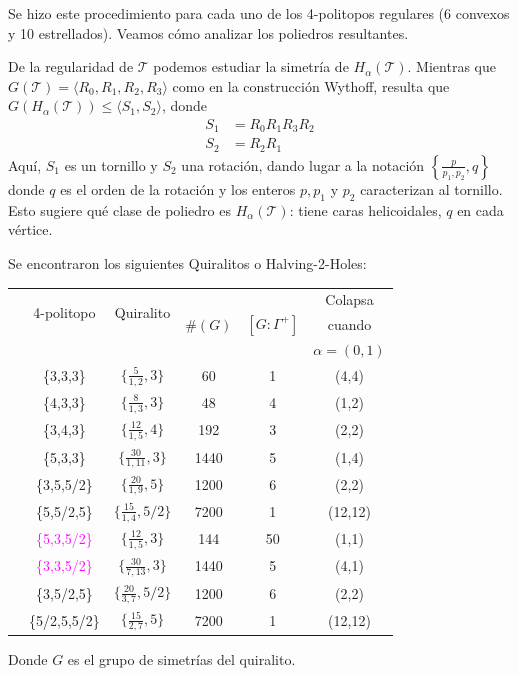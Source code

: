 \documentclass[spanish]{article}
\theoremstyle{definition}
\newcommand{\T}{\mathcal{T}}
\begin{document}
	Se hizo este procedimiento para cada uno de los 4-politopos regulares (6 convexos y 10 estrellados). Veamos cómo analizar los poliedros resultantes.
	
	De la regularidad de $\mathcal{T}$ podemos estudiar la simetría de $H_\alpha(\mathcal{T})$. Mientras que $G(\mathcal{T})=\langle R_0,R_1,R_2,R_3\rangle$ como en la construcción Wythoff, resulta que $G(H_\alpha(\mathcal{T}))\leq \langle S_1,S_2\rangle$, donde
	\begin{align*}
		S_1&=R_0R_1R_3R_2\\
		S_2&=R_2R_1
	\end{align*}
	Aquí, $S_1$ es un tornillo y $S_2$ una rotación, dando lugar a la notación $\left\{\frac{p}{p_1,p_2},q\right\}$ donde $q$ es el orden de la rotación y los enteros $p,p_1$ y $p_2$ caracterizan al tornillo. Esto sugiere qué clase de poliedro es $H_\alpha(\mathcal{T})$: tiene caras helicoidales, $q$ en cada vértice.
	
	Se encontraron los siguientes Quiralitos o Halving-2-Holes:
	
	\begin{center}
		\begin{tabular}{|c|c|c|c|c|c|}
			\hline
			&\multirow{2}{*}{4-politopo} &\multirow{2}{*}{Quiralito}&  \multirow{3}{*}{$\#(G)$} &\multirow{3}{*}{$[G:\Gamma^+]$}& Colapsa\\
			&\multirow{2}{*}{ $\T$}&\multirow{2}{*}{$H_\alpha(T)$}&&&cuando\\
			&&&&&$\alpha=(0,1)$ \\
			\hline\hline
			\multirow{5}{*}{\rotatebox{90}{Convexos}}&\{3,3,3\} & $\{\frac{5}{1,2},3\}$ &60& 1 & (4,4) \\
			&\{4,3,3\} & $\{\frac{8}{1,3},3\}$ &48& 4&(1,2) \\
			&\{3,4,3\} & $\{\frac{12}{1,5},4\}$ &192&3&(2,2) \\
			&\{5,3,3\} & $\{\frac{30}{1,11},3\}$ &1440&5&(1,4)\\
			\hline
			\multirow{6}{*}{\rotatebox{90}{Estrellados}}&\{3,5,5/2\} &$\{\frac{20}{1,9},5\}$&1200&6&(2,2)\\
			&\{5,5/2,5\} & $\{\frac{15}{1,4},5/2\}$ &7200&1&(12,12)\\\cline{2-6}
			&\textcolor{magenta}{\{5,3,5/2\}} & $\{\frac{12}{1,5},3\}$ &144&50&(1,1)\\\cline{2-6}
			&\textcolor{magenta}{\{3,3,5/2\}}&$\{\frac{30}{7,13},3\}$& 1440 & 5 &(4,1)\\\cline{2-6}
			&\{3,5/2,5\}& $\{\frac{20}{3,7},5/2\}$ &1200&6& (2,2) \\
			&\{5/2,5,5/2\} & $\{\frac{15}{2,7},5\}$ &7200&1& (12,12)\\
			\hline
		\end{tabular}
	\end{center}
	Donde $G$ es el grupo de simetrías del quiralito.
	
\end{document}
